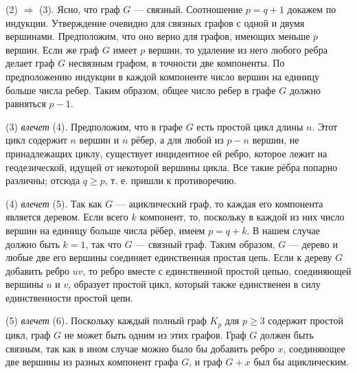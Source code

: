 (2) \(\Rightarrow\) (3). Ясно, что граф \( G \) — связный. Соотношение \( p = q + 1 \) докажем по индукции. Утверждение очевидно для связных графов с одной и двумя вершинами. Предположим, что оно верно для графов, имеющих меньше \( p \) вершин. Если же граф \( G \) имеет \( p \) вершин, то удаление из него любого ребра делает граф \( G \) несвязным графом, в точности две компоненты. По предположению индукции в каждой компоненте число вершин на единицу больше числа ребер. Таким образом, общее число ребер в графе \( G \) должно равняться \( p - 1 \).

(3) \textit{влечет} (4). Предположим, что в графе \( G \) есть простой цикл длины \( n \). Этот цикл содержит \( n \) вершин и \( n \) рёбер, а для любой из \( p - n \) вершин, не принадлежащих циклу, существует инцидентное ей ребро, которое лежит на геодезической, идущей от некоторой вершины цикла. Все такие рёбра попарно различны; отсюда \( q \geq p \), т. е. пришли к противоречию.

(4) \textit{влечет} (5). Так как \( G \) — ациклический граф, то каждая его компонента является деревом. Если всего \( k \) компонент, то, поскольку в каждой из них число вершин на единицу больше числа рёбер, имеем \( p = q + k \). В нашем случае должно быть \( k = 1 \), так что \( G \) — связный граф. Таким образом, \( G \) — дерево и любые две его вершины соединяет единственная простая цепь. Если к дереву \( G \) добавить ребро \( uv \), то ребро вместе с единственной простой цепью, соединяющей вершины \( u \) и \( v \), образует простой цикл, который также единственен в силу единственности простой цепи.

(5) \textit{влечет} (6). Поскольку каждый полный граф \( K_p \) для \( p \geq 3 \) содержит простой цикл, граф \( G \) не может быть одним из этих графов. Граф \( G \) должен быть связным, так как в ином случае можно было бы добавить ребро \( x \), соединяющее две вершины из разных компонент графа \( G \), и граф \( G + x \) был бы ациклическим.

